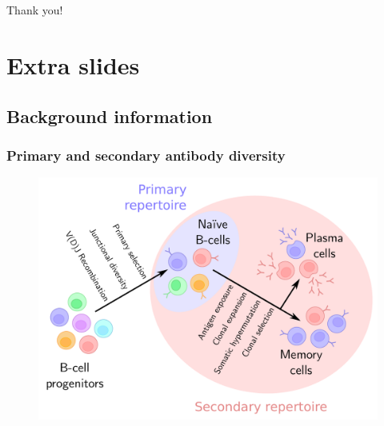\documentclass[presentation]{beamer}
\newlength{\slideheight}
\begin{document}
\section{}
\begin{frame}\begin{center}
\Huge Thank you!
\end{center}\end{frame}




\appendix
\blackslide
\section{Extra slides}

\subsection{Background information}

\begin{frame}
\frametitle{Primary and secondary antibody diversity}
\begin{figure}
\includegraphics[height=\slideheight]{figs/pdf/bcell-repertoire-primary-secondary}
\end{figure}
\end{frame}
\end{document}
